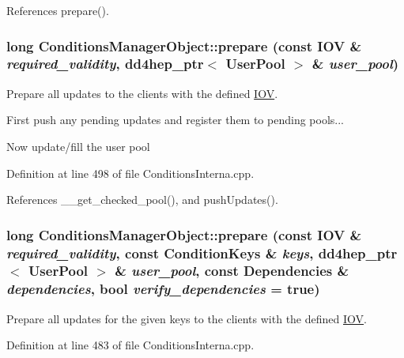 References prepare().\hypertarget{class_d_d4hep_1_1_conditions_1_1_conditions_manager_object_a4550e641d43365715516abc3f82586e6}{
\subsubsection[{prepare}]{\setlength{\rightskip}{0pt plus 5cm}long ConditionsManagerObject::prepare (const {\bf IOV} \& {\em required\_\-validity}, \/  {\bf dd4hep\_\-ptr}$<$ {\bf UserPool} $>$ \& {\em user\_\-pool})}}
\label{class_d_d4hep_1_1_conditions_1_1_conditions_manager_object_a4550e641d43365715516abc3f82586e6}


Prepare all updates to the clients with the defined \hyperlink{class_d_d4hep_1_1_i_o_v}{IOV}. 

First push any pending updates and register them to pending pools...

Now update/fill the user pool 

Definition at line 498 of file ConditionsInterna.cpp.

References \_\-\_\-get\_\-checked\_\-pool(), and pushUpdates().\hypertarget{class_d_d4hep_1_1_conditions_1_1_conditions_manager_object_a50cd5fe85ead70ca4a0561ca37cbc435}{
\subsubsection[{prepare}]{\setlength{\rightskip}{0pt plus 5cm}long ConditionsManagerObject::prepare (const {\bf IOV} \& {\em required\_\-validity}, \/  const {\bf ConditionKeys} \& {\em keys}, \/  {\bf dd4hep\_\-ptr}$<$ {\bf UserPool} $>$ \& {\em user\_\-pool}, \/  const {\bf Dependencies} \& {\em dependencies}, \/  bool {\em verify\_\-dependencies} = {\ttfamily true})}}
\label{class_d_d4hep_1_1_conditions_1_1_conditions_manager_object_a50cd5fe85ead70ca4a0561ca37cbc435}


Prepare all updates for the given keys to the clients with the defined \hyperlink{class_d_d4hep_1_1_i_o_v}{IOV}. 

Definition at line 483 of file ConditionsInterna.cpp.

